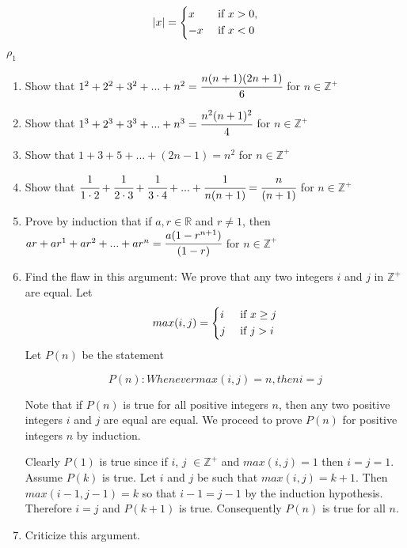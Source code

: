 \documentclass[10pt,letterpaper]{article}
\begin{document}
\[
\left\lvert x \right\rvert = 
  \begin{dcases}
    x & \text{ if } x > 0,    \\
    -x & \text{ if } x < 0
  \end{dcases}
\]

$ {\rho}_1 $ 


\begin{enumerate}
\item Show that $1^2 + 2^2 + 3^2 + . . . + n^2 = \cfrac{n(n+1)(2n+1)}{6}$ for $n \in \mathbb{Z}^+$

\item Show that $1^3 + 2^3 + 3^3 + . . . + n^3 = \cfrac{n^2(n+1)^2}{4}$ for $n \in \mathbb{Z}^+$

\item Show that $1 + 3 + 5 + . . . + (2n -1) = n^2$ for $n \in \mathbb{Z}^+$

\item Show that $\cfrac{1}{1 \cdot 2} + \cfrac{1}{2 \cdot 3} + \cfrac{1}{3 \cdot 4} + . . . + \cfrac[align]{1}{n(n+1)} = \cfrac{n}{(n+1)}$ for $n \in \mathbb{Z}^+$

\item Prove by induction that if $a, r  \in \mathbb{R}$ and $r \neq 1$, then
    $ar + ar^1 + ar^2 + . . . + ar^n = \cfrac{a(1-r^{n+1})}{(1-r)}$ for $n \in \mathbb{Z}^+$

\item Find the flaw in this argument:
We prove that any two integers $i$ and $j$ in $\mathbb{Z}^+$ are equal. Let
  \[
    max(i,j) =
    \begin{dcases}
      i & \text{ if } x \ge j\\
      j & \text{ if } j > i
    \end{dcases}
  \]
  Let $P(n)$ be the statement
  
	\[
      P(n): Whenever max(i,j) = n, then i=j
  \]    
    
  Note that if $P(n)$ is true for all positive integers $n$, then any two positive integers $i$ and $j$ are equal are equal. We proceed to prove $P(n)$ for positive integers $n$ by induction.

  Clearly $P(1)$ is true since if $i$, $j$ $\in \mathbb{Z}^+$ and $max(i,j)=1$ then $i=j=1$. Assume $P(k)$ is true. Let $i$ and $j$ be such that $max(i,j) = k+1$. Then $max(i-1,j-1) = k$ so that $i-1 = j-1$ by the induction hypothesis. Therefore $i=j$ and $P(k+1)$ is true. Consequently $P(n)$ is true for all $n$.

\item Criticize this argument.


\end{enumerate}
\end{document}
